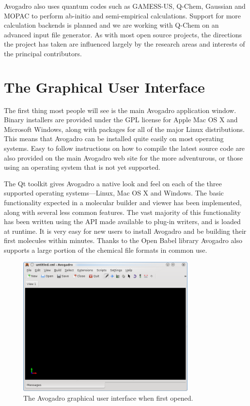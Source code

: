 \documentclass{article}
\begin{document}
Avogadro also uses quantum codes such as GAMESS-US, Q-Chem, Gaussian and MOPAC to perform ab-initio and semi-empirical calculations. Support for more calculation backends is planned and we are working with Q-Chem on an advanced input file generator. As with most open source projects, the directions the project has taken are influenced largely by the research areas and interests of the principal contributors.

\section{The Graphical User Interface}

The first thing most people will see is the main Avogadro application window. Binary installers are provided under the GPL license for Apple Mac OS X and Microsoft Windows, along with packages for all of the major Linux distributions. This means that Avogadro can be installed quite easily on most operating systems. Easy to follow instructions on how to compile the latest source code are also provided on the main Avogadro web site for the more adventurous, or those using an operating system that is not yet supported.

The Qt toolkit gives Avogadro a native look and feel on each of the three supported operating systems---Linux, Mac OS X and Windows. The basic functionality expected in a molecular builder and viewer has been implemented, along with several less common features. The vast majority of this functionality has been written using the API made available to plug-in writers, and is loaded at runtime. It is very easy for new users to install Avogadro and be building their first molecules within minutes. Thanks to the Open Babel library Avogadro also supports a large portion of the chemical file formats in common use.

\begin{figure}
	\includegraphics[width=0.8\textwidth]{images/avogadro-0-9-8}
	\caption{The Avogadro graphical user interface when first opened.}
	\label{f:avogadrogui}
\end{figure}
\end{document}
